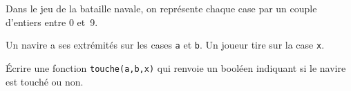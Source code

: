 \exer{}
\setcounter{numques}{0}

\question{} Dans le jeu de la bataille navale, on représente chaque case par un couple d'entiers entre 0 et~9.

Un navire a ses extrémités sur les cases \texttt{a} et \texttt{b}. Un joueur tire sur la case \texttt{x}. 

\'Ecrire une fonction \texttt{touche(a,b,x)} qui renvoie un booléen indiquant si le navire est touché ou non.